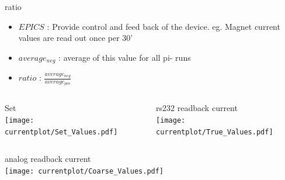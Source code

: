 \documentclass[aspectratio=169,xcolor=dvipsnames]{beamer}
\begin{document}
\begin{frame}{ratio}
  \begin{itemize}
    \item $EPICS$ : Provide control and feed back of the device. eg. Magnet current values are read out once per 30'
    \item $average_{neg}$ : average of this value for all pi- runs
      
    \item $ratio$ : $\frac{average_{neg}}{average_{pos}}$
  \end{itemize}
\end{frame}

\begin{frame}
  \begin{columns}
    \begin{column}[T]{0.5\textwidth}
      Set \\
      \texttt{[image: currentplot/Set\_Values.pdf]}
    \end{column}
    \begin{column}[T]{0.5\textwidth}
        rs232 readback current \\
      \texttt{[image: currentplot/True\_Values.pdf]}
    \end{column}
  \end{columns}
  \begin{columns}
    \begin{column}[T]{0.5\textwidth}
        analog readback current \\
      \texttt{[image: currentplot/Coarse\_Values.pdf]}
    \end{column}
    \begin{column}[T]{0.5\textwidth}
    \end{column}
  \end{columns}


\end{frame}
\end{document}
